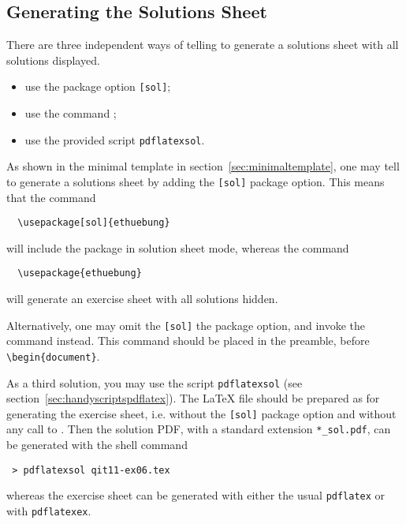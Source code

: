 \documentclass[11pt,a4paper]{article}
\begin{document}
\subsection{Generating the Solutions Sheet}
\label{sec:generateSolutions}

There are three independent ways of telling \ethuebung{} to generate a solutions sheet
with all solutions displayed.
\begin{itemize}
\item use the package option \texttt{[sol]};
\item use the command ;
\item use the provided script \texttt{pdflatexsol}.
\end{itemize}

As shown in the minimal template in section~\ref{sec:minimaltemplate}, one may tell
\ethuebung{} to generate a solutions sheet by adding the \texttt{[sol]} package
option. This means that the command
{\setlength\pkgverbatimoutsidespacing{-3mm}
\begin{pkgverbatim}[-6mm]
\begin{verbatim}
  \usepackage[sol]{ethuebung}
\end{verbatim}
\end{pkgverbatim}}
will include the \ethuebung{} package in solution sheet mode, whereas the command
{\setlength\pkgverbatimoutsidespacing{-3mm}
\begin{pkgverbatim}[-6mm]
\begin{verbatim}
  \usepackage{ethuebung}
\end{verbatim}
\end{pkgverbatim}}
will generate an exercise sheet with all solutions hidden.

Alternatively, one may omit the \texttt{[sol]} the package option, and invoke the
 command instead. This command should be placed in the
preamble, before \verb|\begin{document}|.



As a third solution, you may use the script \texttt{pdflatexsol} (see
section~\ref{sec:handyscriptspdflatex}). The \LaTeX{} file should 
be prepared as for generating the exercise sheet, i.e. without the \texttt{[sol]} package
option and without any call to . Then the solution PDF,
with a standard extension \verb|*_sol.pdf|, can be generated with the shell command
\begin{pkgverbatim}
\begin{verbatim}
 > pdflatexsol qit11-ex06.tex
\end{verbatim}
\end{pkgverbatim}
whereas the exercise sheet can be generated with either the usual \texttt{pdflatex} or
with \texttt{pdflatexex}.
\end{document}
